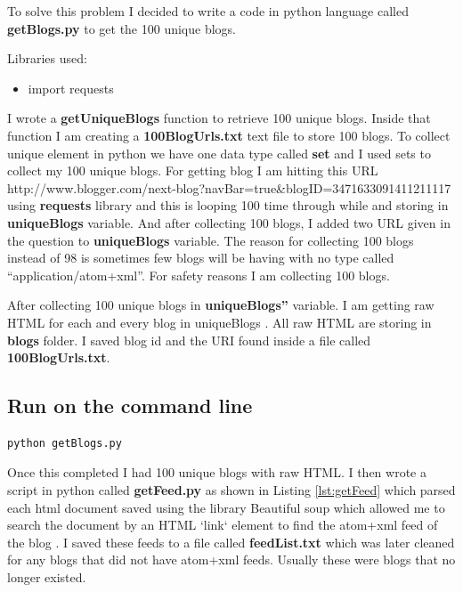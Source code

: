 \documentclass[letterpaper,11pt]{article}
\begin{document}
To solve this problem I decided to write a code in python language called \textbf{getBlogs.py} to get the 100 unique blogs.

Libraries used:
\begin{itemize}
 \item import requests
\end{itemize}

I wrote a \textbf{getUniqueBlogs} function  to retrieve 100 unique blogs. Inside that function I am creating a \textbf{100BlogUrls.txt}  text file to store 100 blogs. To collect unique element in python we have one data type called \textbf{set} and  I used sets to collect my 100 unique blogs. For getting blog I am hitting this URL http://www.blogger.com/next-blog?navBar=true&blogID=3471633091411211117 using \textbf{requests} library  and this is looping 100 time through while  and storing in \textbf{uniqueBlogs} variable. And after collecting 100 blogs, I added two URL given in the question to \textbf{uniqueBlogs} variable. The reason for collecting 100 blogs instead of 98 is sometimes few blogs will be having with no type called “application/atom+xml”.  For safety reasons I am collecting 100 blogs. 

After collecting 100 unique blogs in \textbf{uniqueBlogs”} variable. I am getting raw HTML for each and every blog in uniqueBlogs . All raw HTML are storing in \textbf{blogs}  folder. I saved blog id and the URI found inside a file called \textbf{100BlogUrls.txt}.
\subsection*{Run on the command line}

\begin{lstlisting}[frame=single]
python getBlogs.py
\end{lstlisting}
 


 Once this completed I had 100 unique blogs with raw HTML. I then wrote a script in python  called \textbf{getFeed.py} as shown in Listing \ref{lst:getFeed} which parsed each html document saved using the library Beautiful soup which allowed me to search the document by an HTML `link` element to find the atom+xml feed of the blog \cite{beautifulsoupref}. I saved these feeds to a file called \textbf{feedList.txt} which was later cleaned for any blogs that did not have atom+xml feeds. Usually these were blogs that no longer existed.
\end{document}
